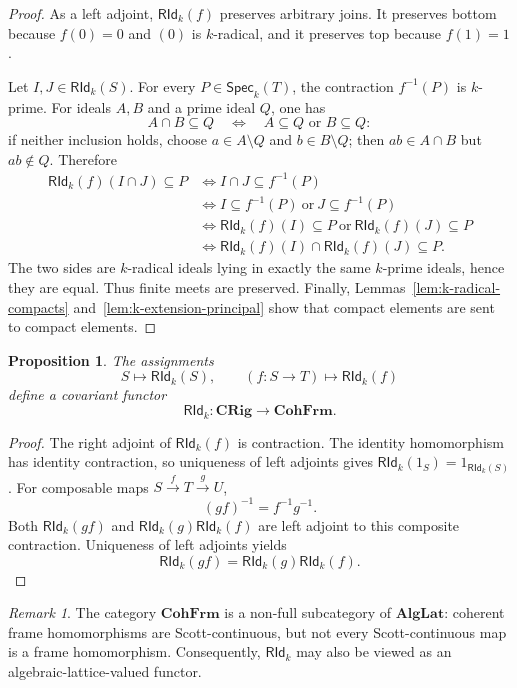 \documentclass[12pt,leqno]{amsart}
\newcommand{\CRig}{\mathbf{CRig}}
\newcommand{\CohFrm}{\mathbf{CohFrm}}
\newcommand{\AlgLat}{\mathbf{AlgLat}}
\newcommand{\Speck}{\mathsf{Spec}_{k}}
\newcommand{\RIdk}{\mathsf{RId}_{k}}
\newtheorem{proposition}[theorem]{Proposition}
\theoremstyle{definition}
\numberwithin{equation}{section}
\theoremstyle{remark}
\newtheorem{remark}[theorem]{Remark}
\begin{document}
\begin{proof}
As a left adjoint, \(\RIdk(f)\) preserves arbitrary joins. It preserves bottom because \(f(0)=0\) and $(0)$ is $k$-radical, and it preserves top because \(f(1)=1\).

Let \(I,J\in\RIdk(S)\). For every \(P\in\Speck(T)\), the contraction \(f^{-1}(P)\) is $k$-prime. For ideals $A,B$ and a prime ideal $Q$, one has
\[
A\cap B\subseteq Q
\quad\Longleftrightarrow\quad
A\subseteq Q\text{ or }B\subseteq Q:
\]
if neither inclusion holds, choose $a\in A\setminus Q$ and $b\in B\setminus Q$; then $ab\in A\cap B$ but $ab\notin Q$. Therefore
\begin{align*}
\RIdk(f)(I\cap J)\subseteq P
&\Longleftrightarrow I\cap J\subseteq f^{-1}(P)\\
&\Longleftrightarrow I\subseteq f^{-1}(P)\ \text{or}\ J\subseteq f^{-1}(P)\\
&\Longleftrightarrow \RIdk(f)(I)\subseteq P\ \text{or}\ \RIdk(f)(J)\subseteq P\\
&\Longleftrightarrow \RIdk(f)(I)\cap\RIdk(f)(J)\subseteq P.
\end{align*}
The two sides are $k$-radical ideals lying in exactly the same $k$-prime ideals, hence they are equal. Thus finite meets are preserved. Finally, Lemmas~\ref{lem:k-radical-compacts} and~\ref{lem:k-extension-principal} show that compact elements are sent to compact elements.
\end{proof}

\begin{proposition}\label{prop:k-radical-functor}
The assignments
\[
S\longmapsto\RIdk(S),
\qquad
(f\colon S\to T)\longmapsto\RIdk(f)
\]
define a covariant functor
\[
\RIdk\colon\CRig\longrightarrow\CohFrm.
\]
\end{proposition}

\begin{proof}
The right adjoint of \(\RIdk(f)\) is contraction. The identity homomorphism has identity contraction, so uniqueness of left adjoints gives \(\RIdk(1_S)=1_{\RIdk(S)}\). For composable maps \(S\xrightarrow{f}T\xrightarrow{g}U\),
\[
(gf)^{-1}=f^{-1}g^{-1}.
\]
Both \(\RIdk(gf)\) and \(\RIdk(g)\RIdk(f)\) are left adjoint to this composite contraction. Uniqueness of left adjoints yields
\[
\RIdk(gf)=\RIdk(g)\RIdk(f).
\]
\end{proof}

\begin{remark}\label{rem:coherent-frames-algebraic-lattices}
The category \(\CohFrm\) is a non-full subcategory of \(\AlgLat\): coherent frame homomorphisms are Scott-continuous, but not every Scott-continuous map is a frame homomorphism. Consequently, \(\RIdk\) may also be viewed as an algebraic-lattice-valued functor.
\end{remark}
\end{document}
